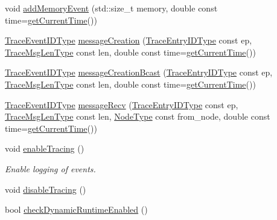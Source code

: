 \begin{DoxyCompactItemize}
\item 
void \hyperlink{structvt_1_1trace_1_1_trace_abc497f6fa641ac1c2c20889815b06dbc}{add\+Memory\+Event} (std\+::size\+\_\+t memory, double const time=\hyperlink{structvt_1_1trace_1_1_trace_a04cf6b76b4ced1bc90d246a34c948db5}{get\+Current\+Time}())
\item 
\hyperlink{namespacevt_1_1trace_a64a7185f3e102df8d8258f263ccd1582}{Trace\+Event\+I\+D\+Type} \hyperlink{structvt_1_1trace_1_1_trace_a5b5091197568d7ed104bb40d68b4ddd7}{message\+Creation} (\hyperlink{namespacevt_1_1trace_a3c14050715ba9eceaeff51fb3de64f2f}{Trace\+Entry\+I\+D\+Type} const ep, \hyperlink{namespacevt_1_1trace_aeb598f45d67d41db7902e494f2f0ce59}{Trace\+Msg\+Len\+Type} const len, double const time=\hyperlink{structvt_1_1trace_1_1_trace_a04cf6b76b4ced1bc90d246a34c948db5}{get\+Current\+Time}())
\item 
\hyperlink{namespacevt_1_1trace_a64a7185f3e102df8d8258f263ccd1582}{Trace\+Event\+I\+D\+Type} \hyperlink{structvt_1_1trace_1_1_trace_ad034b14649101fb530eccfb4e2b958ce}{message\+Creation\+Bcast} (\hyperlink{namespacevt_1_1trace_a3c14050715ba9eceaeff51fb3de64f2f}{Trace\+Entry\+I\+D\+Type} const ep, \hyperlink{namespacevt_1_1trace_aeb598f45d67d41db7902e494f2f0ce59}{Trace\+Msg\+Len\+Type} const len, double const time=\hyperlink{structvt_1_1trace_1_1_trace_a04cf6b76b4ced1bc90d246a34c948db5}{get\+Current\+Time}())
\item 
\hyperlink{namespacevt_1_1trace_a64a7185f3e102df8d8258f263ccd1582}{Trace\+Event\+I\+D\+Type} \hyperlink{structvt_1_1trace_1_1_trace_aa14d58fb03a226e213f72bb03a13bb9f}{message\+Recv} (\hyperlink{namespacevt_1_1trace_a3c14050715ba9eceaeff51fb3de64f2f}{Trace\+Entry\+I\+D\+Type} const ep, \hyperlink{namespacevt_1_1trace_aeb598f45d67d41db7902e494f2f0ce59}{Trace\+Msg\+Len\+Type} const len, \hyperlink{namespacevt_a866da9d0efc19c0a1ce79e9e492f47e2}{Node\+Type} const from\+\_\+node, double const time=\hyperlink{structvt_1_1trace_1_1_trace_a04cf6b76b4ced1bc90d246a34c948db5}{get\+Current\+Time}())
\item 
void \hyperlink{structvt_1_1trace_1_1_trace_ae7ef14764ce87e0ea8baf802db400066}{enable\+Tracing} ()
\begin{DoxyCompactList}\small\item\em Enable logging of events. \end{DoxyCompactList}\item 
void \hyperlink{structvt_1_1trace_1_1_trace_a54f34dbcf8960de7b319e44ef9b76eb0}{disable\+Tracing} ()
\item 
bool \hyperlink{structvt_1_1trace_1_1_trace_a4b911a4f90a4b6b76c03341db7d94fdd}{check\+Dynamic\+Runtime\+Enabled} ()

\end{DoxyCompactItemize}
